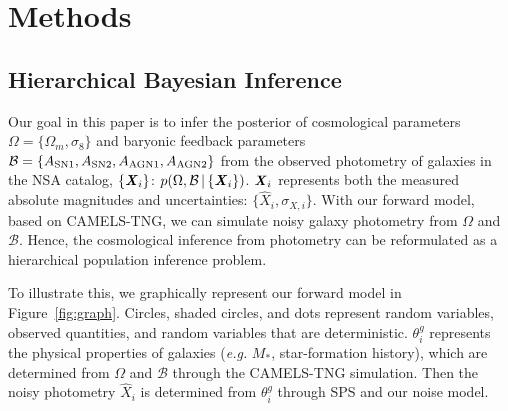 \section{Methods} \label{sec:methods} 
\subsection{Hierarchical Bayesian Inference} \label{sec:hier} 
Our goal in this paper is to infer the posterior of cosmological parameters
$\Omega = \{ \Omega_m, \sigma_8 \}$ and baryonic feedback parameters
$\mathcal{B} = \{ A_{\rm SN1}, A_{\rm SN2}, A_{\rm AGN1}, A_{\rm AGN2}\}$ from
the observed photometry of galaxies in the NSA catalog, $\{\textbf{\textit{X}}_i\}$:
$p(\Omega, \mathcal{B} \,|\, \{{\textbf{\textit{X}}_i}\})$.
${\textbf{\textit{X}}_i}$ represents both the measured absolute magnitudes and
uncertainties: $\{ \hat{X}_i, \sigma_{X,i}\}$. 
With our forward model, based on CAMELS-TNG, we can simulate noisy galaxy
photometry from $\Omega$ and $\mathcal{B}$. 
Hence, the cosmological inference from photometry can be reformulated as a
hierarchical population inference problem. 

To illustrate this, we graphically represent our forward model in
Figure~\ref{fig:graph}.
Circles, shaded circles, and dots represent random variables, observed
quantities, and random variables that are deterministic. 
$\theta_i^g$ represents the physical properties of galaxies (\emph{e.g.} $M_*$,
star-formation history), which are determined from $\Omega$ and $\mathcal{B}$
through the CAMELS-TNG simulation.
Then the noisy photometry $\hat{X}_i$ is determined from $\theta_i^g$ through
SPS and our noise model. 

